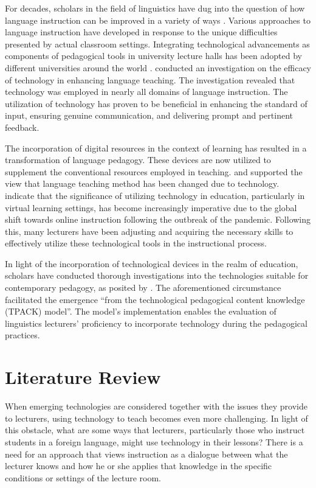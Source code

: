 \documentclass[english]{textolivre}
\begin{document}
For decades, scholars in the field of linguistics have dug into the question of how language instruction can be improved in a variety of ways \cite{al-awawdeh_foreign_2022}. Various approaches to language instruction have developed in response to the unique difficulties presented by actual classroom settings. Integrating technological advancements as components of pedagogical tools in university lecture halls has been adopted by different universities around the world \cite{hartono_language:_2021}. \textcite{kumar_analyzing_2021} conducted an investigation on the efficacy of technology in enhancing language teaching. The investigation revealed that technology was employed in nearly all domains of language instruction. The utilization of technology has proven to be beneficial in enhancing the standard of input, ensuring genuine communication, and delivering prompt and pertinent feedback.

The incorporation of digital resources in the context of learning has resulted in a transformation of language pedagogy. These devices are now utilized to supplement the conventional resources employed in teaching. \textcite{hartono_language:_2021} and \textcite{hall_first_2020} supported the view that language teaching method has been changed due to technology. \textcite{lyublinskaya_analysis_2022} indicate that the significance of utilizing technology in education, particularly in virtual learning settings, has become increasingly imperative due to the global shift towards online instruction following the outbreak of the pandemic. Following this, many lecturers have been adjusting and acquiring the necessary skills to effectively utilize these technological tools in the instructional process.

In light of the incorporation of technological devices in the realm of education, scholars have conducted thorough investigations into the technologies suitable for contemporary pedagogy, as posited by \textcite{hartono_language:_2021}. The aforementioned circumstance facilitated the emergence “from the technological pedagogical content knowledge (TPACK) model”. The model’s implementation enables the evaluation of linguistics lecturers’ proficiency to incorporate technology during the pedagogical practices.

\section{Literature Review}

When emerging technologies are considered together with the issues they provide to lecturers, using technology to teach becomes even more challenging. In light of this obstacle, what are some ways that lecturers, particularly those who instruct students in a foreign language, might use technology in their lessons? There is a need for an approach that views instruction as a dialogue between what the lecturer knows and how he or she applies that knowledge in the specific conditions or settings of the lecture room.
\end{document}

